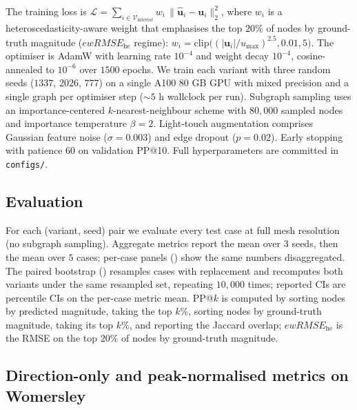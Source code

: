 \documentclass[10pt,a4paper]{article}
\newcommand{\ewRMSE}{ewRMSE_{\text{he}}}
\begin{document}
The training loss is
$\mathcal{L} = \sum_{i \in \mathcal{V}_{\text{interior}}}
w_i \,\|\hat{\mathbf{u}}_i - \mathbf{u}_i\|_2^2$,
where $w_i$ is a heteroscedasticity-aware weight that emphasises the
top $20\%$ of nodes by ground-truth magnitude
($\ewRMSE$ regime): $w_i = \mathrm{clip}\!\big((|\mathbf{u}_i|/u_{\max})^{2.5}, 0.01, 5\big)$.
The optimiser is AdamW with learning rate $10^{-4}$ and weight decay
$10^{-4}$, cosine-annealed to $10^{-6}$ over $1500$ epochs. We train
each variant with three random seeds ($1337$, $2026$, $777$) on a
single A100 80 GB GPU with mixed precision and a single graph per
optimiser step ($\sim\!5$ h wallclock per run). Subgraph sampling uses
an importance-centered $k$-nearest-neighbour scheme with $80{,}000$
sampled nodes and importance temperature $\beta=2$. Light-touch
augmentation comprises Gaussian feature noise ($\sigma\!=\!0.003$) and
edge dropout ($p\!=\!0.02$). Early stopping with patience $60$ on
validation PP@10. Full hyperparameters are committed in
\texttt{configs/}.

\subsection*{Evaluation}

For each (variant, seed) pair we evaluate every test case at full
mesh resolution (no subgraph sampling). Aggregate metrics report the
mean over $3$ seeds, then the mean over $5$ cases; per-case panels
() show the same numbers disaggregated. The paired
bootstrap () resamples cases with replacement and
recomputes both variants under the same resampled set, repeating
$10{,}000$ times; reported CIs are percentile CIs on the per-case
metric mean. PP@$k$ is computed by sorting nodes by predicted
magnitude, taking the top $k\%$, sorting nodes by ground-truth
magnitude, taking its top $k\%$, and reporting the Jaccard overlap;
$\ewRMSE$ is the RMSE on the top $20\%$ of nodes by ground-truth
magnitude.

\subsection*{Direction-only and peak-normalised metrics on Womersley}
\end{document}
